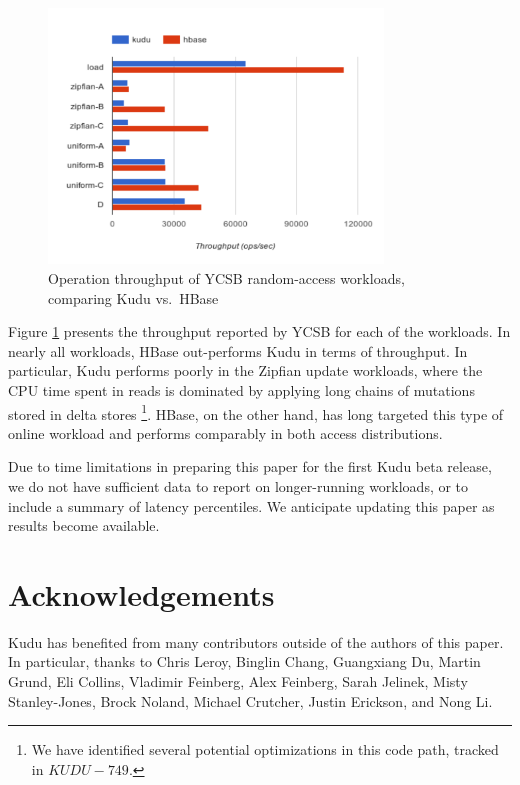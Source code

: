 \documentclass[twocolumn,9pt]{article}
\begin{document}
\begin{figure}
  \includegraphics[width=3.5in]{ycsb-results.pdf}
  \caption{Operation throughput of YCSB random-access workloads, comparing Kudu vs.\ HBase}
  \label{fig:ycsb_throughput}
\end{figure}

Figure \ref{fig:ycsb_throughput} presents the throughput reported by YCSB for each of the
workloads. In nearly all workloads, HBase out-performs Kudu in terms of throughput. In
particular, Kudu performs poorly in the Zipfian update workloads, where the CPU time
spent in reads is dominated by applying long chains of mutations stored in delta stores
\footnote{We have identified several potential optimizations in this code path, tracked
in $KUDU-749$.}. HBase, on the other hand, has long targeted this type of online workload
and performs comparably in both access distributions.

Due to time limitations in preparing this paper for the first Kudu beta release, we do
not have sufficient data to report on longer-running workloads, or to include a summary
of latency percentiles. We anticipate updating this paper as results become available.


\section{Acknowledgements}
Kudu has benefited from many contributors outside of the authors of this paper. In particular, thanks to Chris Leroy, Binglin Chang, Guangxiang Du, Martin Grund, Eli Collins, Vladimir Feinberg, Alex Feinberg, Sarah Jelinek, Misty Stanley-Jones, Brock Noland, Michael Crutcher, Justin Erickson, and Nong Li.



\end{document}
